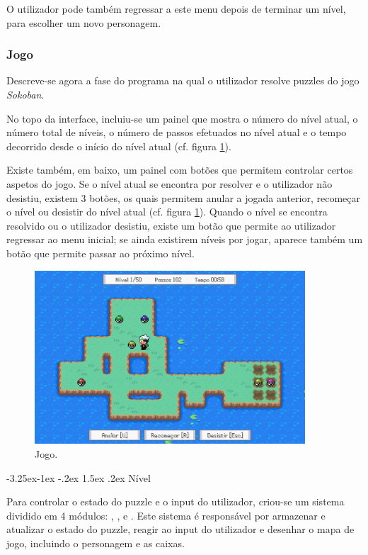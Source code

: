 \documentclass[a4paper]{article}
\makeatletter
\renewcommand\paragraph{\@startsection{paragraph}{4}{\z@}%
	{-3.25ex\@plus -1ex \@minus -.2ex}%
	{1.5ex \@plus .2ex}%
	{\normalfont\normalsize\bfseries}}
\makeatother
\begin{document}
O utilizador pode também regressar a este menu depois de terminar um nível, para escolher um novo personagem.

\subsubsection{Jogo}

Descreve-se agora a fase do programa na qual o utilizador resolve puzzles do jogo \textit{Sokoban}.

No topo da interface, incluiu-se um painel que mostra o número do nível atual, o número total de níveis, o número de passos efetuados no nível atual e o tempo decorrido desde o início do nível atual (cf. figura \ref{fig:game}).

Existe também, em baixo, um painel com botões que permitem controlar certos aspetos do jogo. Se o nível atual se encontra por resolver e o utilizador não desistiu, existem 3 botões, os quais permitem anular a jogada anterior, recomeçar o nível ou desistir do nível atual (cf. figura \ref{fig:game}). Quando o nível se encontra resolvido ou o utilizador desistiu, existe um botão que permite ao utilizador regressar ao menu inicial; se ainda existirem níveis por jogar, aparece também um botão que permite passar ao próximo nível.

\begin{figure}[ht]
	\centering
	\includegraphics[width=0.9\textwidth]{images/game.png}
	\caption{Jogo.}
	\label{fig:game}
\end{figure}

\paragraph{Nível}

Para controlar o estado do puzzle e o input do utilizador, criou-se um sistema dividido em 4 módulos: , ,  e . Este sistema é responsável por armazenar e atualizar o estado do puzzle, reagir ao input do utilizador e desenhar o mapa de jogo, incluindo o personagem e as caixas.
\end{document}
